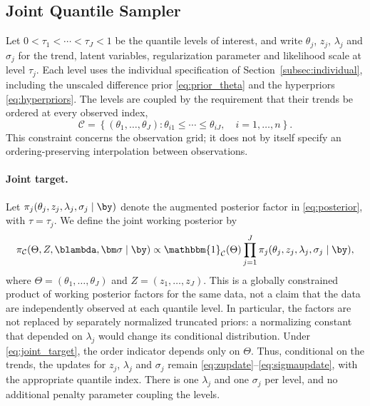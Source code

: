 \subsection{Joint Quantile Sampler}
\label{subsec:joint}

Let $0 < \tau_1 < \cdots < \tau_J < 1$ be the quantile levels of interest, and write $\theta_j$, $z_j$, $\lambda_j$ and $\sigma_j$ for the trend, latent variables, regularization parameter and likelihood scale at level $\tau_j$. Each level uses the individual specification of Section~\ref{subsec:individual}, including the unscaled difference prior \eqref{eq:prior_theta} and the hyperpriors \eqref{eq:hyperpriors}. The levels are coupled by the requirement that their trends be ordered at every observed index,
\begin{equation}
    \mathcal C = \left\{(\theta_1,\ldots,\theta_J):
    \theta_{i1} \leq \cdots \leq \theta_{iJ},\quad i=1,\ldots,n\right\}.
    \label{eq:joint_order}
\end{equation}
This constraint concerns the observation grid; it does not by itself specify an ordering-preserving interpolation between observations.

\paragraph{Joint target.} Let $\pi_j(\theta_j,z_j,\lambda_j,\sigma_j\mid\by)$ denote the augmented posterior factor in \eqref{eq:posterior}, with $\tau=\tau_j$. We define the joint working posterior by
\begin{equation}
    \pi_{\mathcal C}(\Theta,Z,\blambda,\bm\sigma\mid\by)
    \propto \mathbbm{1}_{\mathcal C}(\Theta)
    \prod_{j=1}^J \pi_j(\theta_j,z_j,\lambda_j,\sigma_j\mid\by),
    \label{eq:joint_target}
\end{equation}
where $\Theta=(\theta_1,\ldots,\theta_J)$ and $Z=(z_1,\ldots,z_J)$. This is a globally constrained product of working posterior factors for the same data, not a claim that the data are independently observed at each quantile level. In particular, the factors are not replaced by separately normalized truncated priors: a normalizing constant that depended on $\lambda_j$ would change its conditional distribution. Under \eqref{eq:joint_target}, the order indicator depends only on $\Theta$. Thus, conditional on the trends, the updates for $z_j$, $\lambda_j$ and $\sigma_j$ remain \eqref{eq:zupdate}--\eqref{eq:sigmaupdate}, with the appropriate quantile index. There is one $\lambda_j$ and one $\sigma_j$ per level, and no additional penalty parameter coupling the levels.

